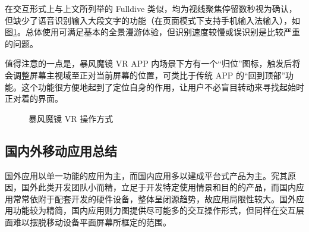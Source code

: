 在交互形式上与上文所列举的 Fulldive 类似，均为视线聚焦停留数秒视为确认，但缺少了语音识别输入大段文字的功能（在页面模式下支持手机输入法输入），如图\ref{fig:storm}。总体使用可满足基本的全景漫游体验，但识别速度较慢或误识别是比较严重的问题。

值得注意的一点是，暴风魔镜 VR APP 内场景下方有一个“归位”图标，触发后将会调整屏幕主视域至正对当前屏幕的位置，可类比于传统 APP 的“回到顶部”功能。这个功能很方便地起到了定位自身的作用，让用户不必盲目转动来寻找起始时正对着的界面。


\begin{figure}[htp]
\centering
{}
\caption{暴风魔镜 VR 操作方式}
\label{fig:storm}
\end{figure}

\subsection{国内外移动应用总结}
国外应用以单一功能的应用为主，而国内应用多以建成平台式产品为主。究其原因，国外此类开发团队小而精，立足于开发特定使用情景和目的的产品，而国内应用常常依附于配套开发的硬件设备，整体呈闭源趋势，故应用局限性较大。国外应用功能较为精简，国内应用则力图提供尽可能多的交互操作形式，但同样在交互层面难以摆脱移动设备平面屏幕所框定的范围。
